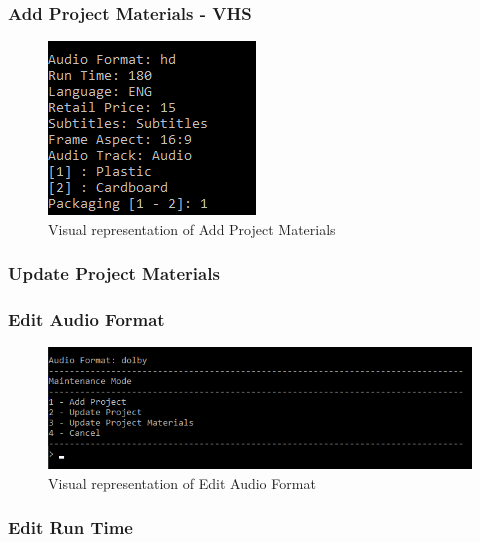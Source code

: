 \documentclass[
  english,
  a4paper,
,tablecaptionabove
]{scrartcl}
\begin{document}
\hypertarget{add-project-materials---vhs}{%
\subsubsection{Add Project Materials -
VHS}\label{add-project-materials---vhs}}

\begin{figure}
\centering
\includegraphics{images/ui-screenshots/add-project-materials-vhs.png}
\caption{Visual representation of Add Project Materials}
\end{figure}

\newpage

\hypertarget{update-project-materials}{%
\subsubsection{Update Project
Materials}\label{update-project-materials}}

\hypertarget{edit-audio-format}{%
\subsubsection{Edit Audio Format}\label{edit-audio-format}}

\begin{figure}
\centering
\includegraphics{images/ui-screenshots/update-project-material-audio-format.png}
\caption{Visual representation of Edit Audio Format}
\end{figure}

\newpage

\hypertarget{edit-run-time}{%
\subsubsection{Edit Run Time}\label{edit-run-time}}
\end{document}
